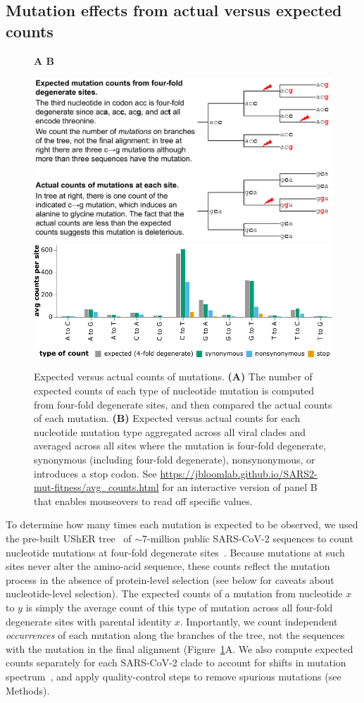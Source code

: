 \documentclass[9pt,twocolumn,twoside]{gsajnl_modified}
\begin{document}
\subsection{Mutation effects from actual versus expected counts}

\begin{figure}
{\bf \Large A \hspace{0.47\linewidth} B}

\includegraphics[width=0.48\linewidth,valign=t]{figs/schematic/schematic.pdf}
\hspace{0.02\linewidth}
\includegraphics[width=0.5\linewidth,valign=t]{figs/avg_counts.pdf}
\caption{
Expected versus actual counts of mutations.
{\bf (A)}
The number of expected counts of each type of nucleotide mutation is computed from four-fold degenerate sites, and then compared the actual counts of each mutation.
{\bf (B)}
Expected versus actual counts for each nucleotide mutation type aggregated across all viral clades and averaged across all sites where the mutation is four-fold degenerate, synonymous (including four-fold degenerate), nonsynonymous, or introduces a stop codon.
See \url{https://jbloomlab.github.io/SARS2-mut-fitness/avg_counts.html} for an interactive version of panel B that enables mouseovers to read off specific values.
\label{fig:expected_vs_actual}
}
\end{figure}

To determine how many times each mutation is expected to be observed, we used the pre-built UShER tree~\citep{mcbroome2021daily,turakhia2021ultrafast,lanfear2020} of $\sim$7-million public SARS-CoV-2 sequences to count nucleotide mutations at four-fold degenerate sites~\citep[Figure~\ref{fig:expected_vs_actual}A;][]{bloom2023evolution}.
Because mutations at such sites never alter the amino-acid sequence, these counts reflect the mutation process in the absence of protein-level selection (see below for caveats about nucleotide-level selection).
The expected counts of a mutation from nucleotide $x$ to $y$ is simply the average count of this type of mutation across all four-fold degenerate sites with parental identity $x$.
Importantly, we count independent \emph{occurrences} of each mutation along the branches of the tree, not the sequences with the mutation in the final alignment (Figure~\ref{fig:expected_vs_actual}A.
We also compute expected counts separately for each SARS-CoV-2 clade to account for shifts in mutation spectrum~\citep{bloom2023evolution,ruis2022mutational}, and apply quality-control steps to remove spurious mutations (see Methods).
\end{document}
